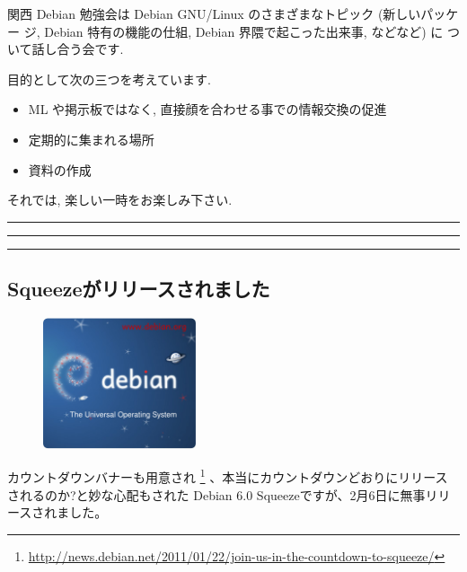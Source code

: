 \documentclass[mingoth,a4paper]{jsarticle}
\begin{document}
関西 Debian 勉強会は Debian GNU/Linux のさまざまなトピック (新しいパッケー
ジ, Debian 特有の機能の仕組, Debian 界隈で起こった出来事, などなど) に
ついて話し合う会です.

目的として次の三つを考えています.
\begin{itemize}
      \item ML や掲示板ではなく, 直接顔を合わせる事での情報交換の促進
      \item 定期的に集まれる場所
      \item 資料の作成
\end{itemize}

それでは, 楽しい一時をお楽しみ下さい.

\clearpage

\begin{minipage}[b]{0.2\hsize}
 {}
\end{minipage}
\begin{minipage}[b]{0.8\hsize}
\hrule
\vspace{2mm}
\hrule
\setcounter{tocdepth}{1}
\tableofcontents
\vspace{2mm}
\hrule
\end{minipage}


\subsection{Squeezeがリリースされました}

\begin{figure}
  \begin{center}
   \includegraphics[width=4.5cm]{image201102/bannersqueeze.jpg}
  \end{center}
 \vspace{-0.5cm}
\end{figure}

カウントダウンバナーも用意され
\footnote{\url{http://news.debian.net/2011/01/22/join-us-in-the-countdown-to-squeeze/}}
、本当にカウントダウンどおりにリリースされるのか?と妙な心配もされた
Debian 6.0 Squeezeですが、2月6日に無事リリースされました。
\end{document}
